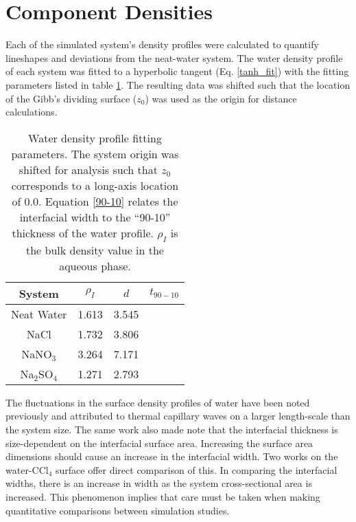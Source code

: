 \section{Component Densities}



Each of the simulated system's density profiles were calculated to quantify lineshapes and deviations from the neat-water system. The water density profile of each system was fitted to a hyperbolic tangent (Eq. \ref{tanh_fit}) with the fitting parameters listed in table \ref{water_params}. The resulting data was shifted such that the location of the Gibb's dividing surface ($z_0$) was used as the origin for distance calculations.

\begin{table}[htdp]
	\begin{center}
	\begin{tabular}{|c||c|c|c|}
		\hline
		System & $\rho_I$ & $d$ & $t_{90-10}$ \\ \hline
		Neat Water & 1.613 & 3.545 \\ 
		NaCl & 1.732 & 3.806 \\
		NaNO$_3$ & 3.264 & 7.171 \\
		Na$_2$SO$_4$ & 1.271 & 2.793 \\
		\hline
	\end{tabular}
	\end{center}
	\caption{Water density profile fitting parameters. The system origin was shifted for analysis such that $z_0$ corresponds to a long-axis location of 0.0. Equation \ref{90-10} relates the interfacial width to the ``90-10'' thickness of the water profile. $\rho_I$ is the bulk density value in the aqueous phase.}
	\label{water_params}
\end{table}

The fluctuations in the surface density profiles of water have been noted previously and attributed to thermal capillary waves on a larger length-scale than the system size.\cite{Chang1996} The same work also made note that the interfacial thickness is size-dependent on the interfacial surface area. Increasing the surface area dimensions should cause an increase in the interfacial width. Two works on the water-CCl$_4$ surface offer direct comparison of this.\cite{Chang1996,Hore2008} In comparing the interfacial widths, there is an increase in width as the system cross-sectional area is increased. This phenomenon implies that care must be taken when making quantitative comparisons between simulation studies.

